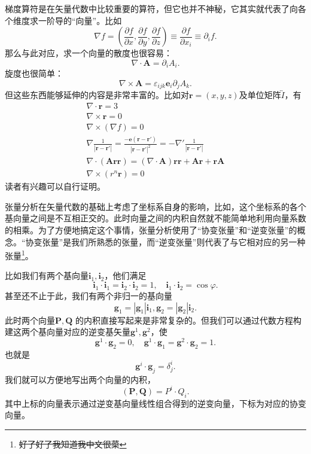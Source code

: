 \documentclass[12pt,a4paper,openany,twoside]{book}
\numberwithin{equation}{section}
\begin{document}
梯度算符是在矢量代数中比较重要的算符，但它也并不神秘，它其实就代表了向各个维度求一阶导的``向量''。比如
\[
	\nabla f = \left( \frac{\partial f}{\partial x} ,\frac{\partial f}{\partial y} ,\frac{\partial f}{\partial z}  \right) \equiv \frac{\partial f}{\partial x_i} \equiv \partial_i f
.\] 
那么与此对应，求一个向量的散度也很容易：
\[
	\nabla \cdot \mathbf{A} = \partial_i A_i 
.\] 
旋度也很简单：
\[
	\nabla \times \mathbf{A} = \varepsilon_{ijk} \mathbf{e}_i \partial_j A_k
.\] 
但这些东西能够延伸的内容是非常丰富的。比如对$\mathbf{r} = (x,y,z)$及单位矩阵$\overleftrightarrow{I}$，有
\begin{align}
	\nabla \cdot \mathbf{r} = 3 \\
	\nabla \times \mathbf{r} = 0 \\
	\nabla \times (\nabla f) = 0 \\
	\nabla \frac{1}{|\mathbf{r}-\mathbf{r}'|} = \frac{- \mathbf{e}(\mathbf{r}-\mathbf{r}')}{|\mathbf{r}-\mathbf{r}'|^2} = - \nabla' \frac{1}{|\mathbf{r}-\mathbf{r}'|} \\
	\nabla\cdot(\mathbf{A}\mathbf{r}\mathbf{r}) = (\nabla \cdot \mathbf{A})\mathbf{r}\mathbf{r} + \mathbf{A} \mathbf{r}+ \mathbf{r}\mathbf{A} \\
	\nabla\times(r^n \mathbf{r}) = 0 
\end{align}
读者有兴趣可以自行证明。

张量分析在矢量代数的基础上考虑了坐标系自身的影响，比如，这个坐标系的各个基向量之间是不互相正交的。此时向量之间的内积自然就不能简单地利用向量系数的相乘。为了方便地搞定这个事情，张量分析使用了``协变张量''和``逆变张量''的概念。``协变张量''是我们所熟悉的张量，而``逆变张量''则代表了与它相对应的另一种张量\footnote{\sout{好了好了我知道我中文很菜}}。

比如我们有两个基向量$\mathbf{i}_1,\mathbf{i}_2$，他们满足
\[
	\mathbf{i}_1 \cdot \mathbf{i}_1 = \mathbf{i}_2 \cdot \mathbf{i}_2 = 1, \quad \mathbf{i}_1 \cdot \mathbf{i}_2 = \cos{\varphi}
.\] 
甚至还不止于此，我们有两个非归一的基向量
\[
\mathbf{g}_1 = | \mathbf{g}_1| \mathbf{i}_1, \mathbf{g}_2 = |\mathbf{g}_2| \mathbf{i}_2
.\] 
此时两个向量$\mathbf{P},\mathbf{Q}$ 的内积直接写起来是非常复杂的。但我们可以通过代数方程构建这两个基向量对应的逆变基矢量$\mathbf{g}^1,\mathbf{g}^2$，使
\[
	\mathbf{g}^1 \cdot \mathbf{g}_2  = 0, \quad \mathbf{g}^1 \cdot \mathbf{g}_1 = \mathbf{g}^2 \cdot \mathbf{g}_2 = 1 
.\] 
也就是
\[
\mathbf{g}^i \cdot \mathbf{g}_j = \delta^i_j
.\]
我们就可以方便地写出两个向量的内积，
\[
	(\mathbf{P},\mathbf{Q}) = P^i \cdot Q_i
.\] 
其中上标的向量表示通过逆变基向量线性组合得到的逆变向量，下标为对应的协变向量。
\end{document}
